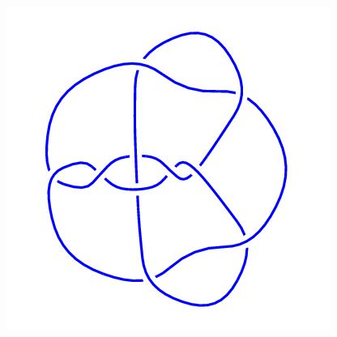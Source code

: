 \begin{figure}[H]
\begin{minipage}[b]{.18\linewidth}
    \end{minipage}
    \begin{minipage}[b]{.18\linewidth}
        \centering
        \includegraphics[width=\linewidth]{../data/10_111.png}
    \end{minipage}
\end{figure}
